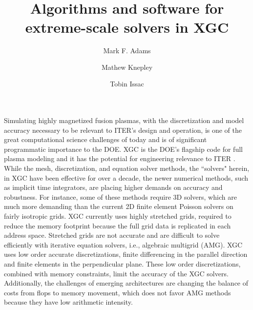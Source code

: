 \documentclass[review]{siamart}
\title{Algorithms and software for extreme-scale solvers in XGC}
\author{Mark F. Adams\and Mathew Knepley\and Tobin Issac}
\begin{document}
\maketitle

Simulating highly magnetized fusion plasmas, with the discretization and model accuracy necessary to be relevant to ITER's design and operation, is one of the great computational science challenges of today and is of significant programmatic  importance to the DOE.
XGC is the DOE's flagship code for full plasma modeling and it has the potential for engineering relevance to ITER \cite{Chang09}.
While the mesh, discretization, and equation solver methods, the ``solvers" herein, in XGC have been effective for over a decade, the newer numerical methods, such as implicit time integrators, are placing higher demands on accuracy and robustness.
For instance, some of these methods require 3D solvers, which are much more demanding than the current 2D finite element Poisson solvers on fairly isotropic grids.
XGC currently uses highly stretched grids, required to reduce the memory footprint because the full grid data is replicated in each address space.
Stretched grids are not accurate and are difficult to solve efficiently with iterative equation solvers, i.e., algebraic multigrid (AMG).
XGC uses low order accurate discretizations, finite differencing in the parallel direction and finite elements in the perpendicular plane.
These low order discretizations, combined with memory constraints, limit the accuracy of the XGC solvers.
Additionally, the challenges of emerging architectures are changing the balance of costs from flops to memory movement, which does not favor AMG methods because they have low arithmetic intensity.
\end{document}
